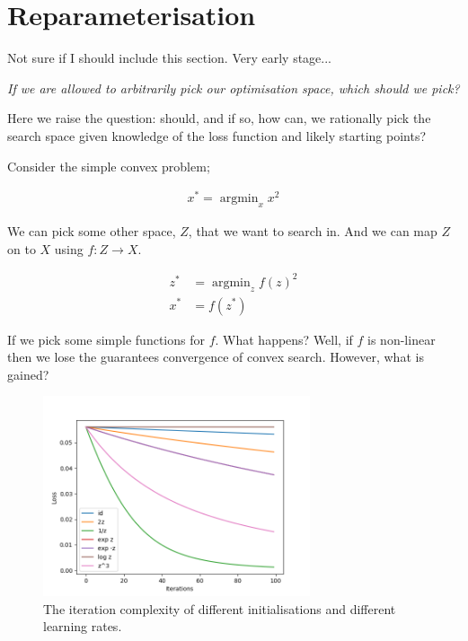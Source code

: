 %

\newpage
\section{Reparameterisation}


{\color{red}Not sure if I should include this section. Very early stage...}

\begin{displayquote}
  \textsl{If we are allowed to arbitrarily pick our optimisation space, which should we pick?}
\end{displayquote}

Here we raise the question: should, and if so, how can, we rationally pick the
search space given knowledge of the loss function and likely starting points?

Consider the simple convex problem;

\begin{align*}
  x^{* } = \mathop{\text{argmin}}_{x} x^2
\end{align*}

We can pick some other space, $Z$, that we want to search in. And we can map $Z$ on to $X$ using $f: Z \to X$.

\begin{align*}
  z^{* } &=\mathop{\text{argmin}}_{z} f(z)^2 \\
    x^{* } &= f(z^{* })
\end{align*}

If we pick some simple functions for $f$. What happens? Well, if $f$ is non-linear
then we lose the guarantees convergence of convex search. However, what is gained?

\begin{figure}[h!]
\centering
\includegraphics[width=0.7\textwidth,height=0.35\textheight]{../../pictures/figures/reparam-ce-04.png}
\caption{The iteration complexity of different initialisations and different learning rates.}
\end{figure}

